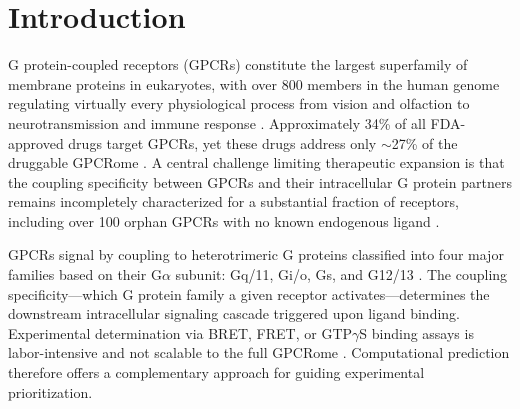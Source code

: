 \documentclass[11pt,a4paper]{article}
\begin{document}
\begin{abstract}
\textbf{Availability:} Source code, pre-trained models, and datasets are available at \url{https://github.com/nblvguohao/gpcr-coupling-leakage-benchmark} under the MIT license. The companion tool \texttt{gpcr-coupling} provides a command-line interface for prediction and feature extraction.

\textbf{Contact:} \href{mailto:wqy@ahau.edu.cn}{wqy@ahau.edu.cn}; \href{mailto:glc@ahau.edu.cn}{glc@ahau.edu.cn}

\textbf{Supplementary information:} Supplementary data including detailed parameter configurations, sensitivity analyses, per-family performance breakdowns, and extended method comparisons are available online.

\end{abstract}

\section{Introduction}

G protein-coupled receptors (GPCRs) constitute the largest superfamily of membrane proteins in eukaryotes, with over 800 members in the human genome regulating virtually every physiological process from vision and olfaction to neurotransmission and immune response \cite{pierce2002seven, rosenbaum2009structure}. Approximately 34\% of all FDA-approved drugs target GPCRs, yet these drugs address only $\sim$27\% of the druggable GPCRome \cite{hauser2017trends, sriram2019gprotein}. A central challenge limiting therapeutic expansion is that the coupling specificity between GPCRs and their intracellular G protein partners remains incompletely characterized for a substantial fraction of receptors, including over 100 orphan GPCRs with no known endogenous ligand \cite{tang2023orphan}.

GPCRs signal by coupling to heterotrimeric G proteins classified into four major families based on their G$\alpha$ subunit: Gq/11, Gi/o, Gs, and G12/13 \cite{wettschureck2005mammalian}. The coupling specificity---which G protein family a given receptor activates---determines the downstream intracellular signaling cascade triggered upon ligand binding. Experimental determination via BRET, FRET, or GTP$\gamma$S binding assays is labor-intensive and not scalable to the full GPCRome \cite{olsen2020gprotein}. Computational prediction therefore offers a complementary approach for guiding experimental prioritization.
\end{document}
